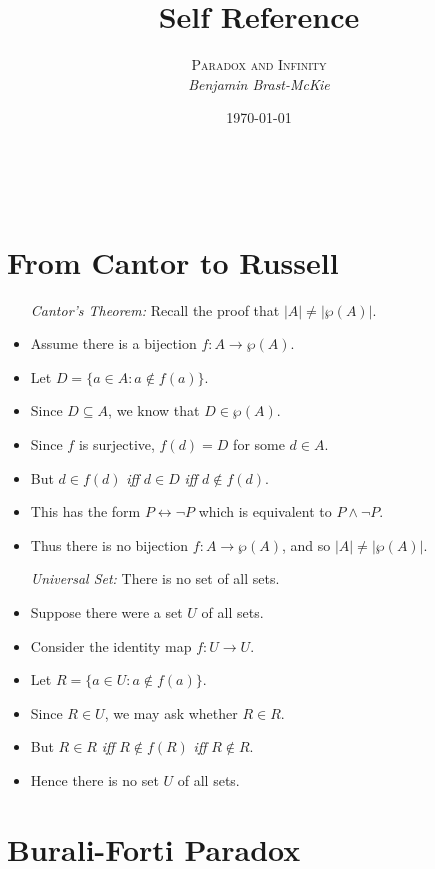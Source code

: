 \documentclass[a4paper, 11pt]{article} %
\title{\textbf{Self Reference}} %
\author{\textsc{Paradox and Infinity}\\ \em Benjamin Brast-McKie} %
\date{\today} %
\makeatletter
\newcommand{\set}[1]{\lbrace#1\rbrace} %
\newcommand{\abs}[1]{|#1|} %
\renewcommand{\maketitle}{ %
\begin{flushright} %
{\LARGE\@title} %

\vspace{10pt} %

{\@author} %
\\\@date %

\vspace{10pt} %
\end{flushright}
}
\makeatother
\begin{document}
\maketitle %

\thispagestyle{empty}



\section*{From Cantor to Russell}

  \begin{itemize}
    \item[\it Cantor's Theorem:] Recall the proof that $\abs{A} \neq \abs{\wp(A)}$.
      \item Assume there is a bijection $f: A \to \wp(A)$.
      \item Let $D=\set{a \in A: a \notin f(a)}$.
      \item Since $D \subseteq A$, we know that $D \in \wp(A)$.
      \item Since $f$ is surjective, $f(d) = D$ for some $d \in A$. 
      \item But $d \in f(d)$ \textit{iff} $d \in D$ \textit{iff} $d \notin f(d)$.
      \item This has the form $P \leftrightarrow \neg P$ which is equivalent to $P \wedge \neg P$. 
      \item Thus there is no bijection $f: A \to \wp(A)$, and so $\abs{A} \neq \abs{\wp(A)}$.
    \item[\it Universal Set:] There is no set of all sets.
      \item Suppose there were a set $U$ of all sets. 
      \item Consider the identity map $f: U \to U$.
      \item Let $R = \set{a \in U: a \notin f(a)}$.
      \item Since $R \in U$, we may ask whether $R \in R$.
      \item But $R \in R$ \textit{iff} $R \notin f(R)$ \textit{iff} $R \not \in R$. 
      \item Hence there is no set $U$ of all sets.
  \end{itemize}




\section*{Burali-Forti Paradox}
\end{document}
